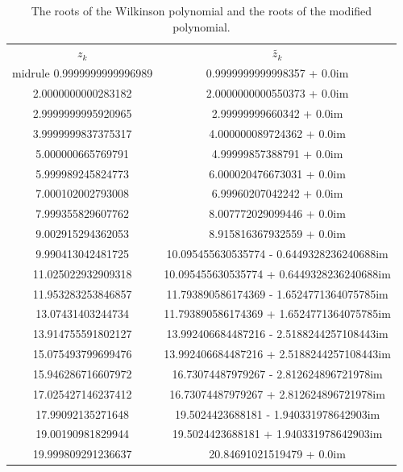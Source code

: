 \documentclass[a4paper, 12pt]{article}
\begin{document}
\begin{table}[H]
\centering
\begin{tabular}{@{}cc@{}}
\toprule
$z_k$              & $\tilde{z_k}$ \\ midrule
0.9999999999996989 & 0.9999999999998357 + 0.0im \\ \midrule
2.0000000000283182 & 2.0000000000550373 + 0.0im \\ \midrule
2.9999999995920965 & 2.99999999660342 + 0.0im \\ \midrule
3.9999999837375317 & 4.000000089724362 + 0.0im \\ \midrule
5.000000665769791  & 4.99999857388791 + 0.0im \\ \midrule
5.999989245824773  & 6.000020476673031 + 0.0im \\ \midrule
7.000102002793008  & 6.99960207042242 + 0.0im \\ \midrule
7.999355829607762  & 8.007772029099446 + 0.0im \\ \midrule
9.002915294362053  & 8.915816367932559 + 0.0im \\ \midrule
9.990413042481725  & 10.095455630535774 - 0.6449328236240688im \\ \midrule
11.025022932909318 & 10.095455630535774 + 0.6449328236240688im \\ \midrule
11.953283253846857 & 11.793890586174369 - 1.6524771364075785im \\ \midrule
13.07431403244734  & 11.793890586174369 + 1.6524771364075785im \\ \midrule
13.914755591802127 & 13.992406684487216 - 2.5188244257108443im \\ \midrule
15.075493799699476 & 13.992406684487216 + 2.5188244257108443im \\ \midrule
15.946286716607972 & 16.73074487979267 - 2.812624896721978im \\ \midrule
17.025427146237412 & 16.73074487979267 + 2.812624896721978im \\ \midrule
17.99092135271648  & 19.5024423688181 - 1.940331978642903im \\ \midrule
19.00190981829944  & 19.5024423688181 + 1.940331978642903im \\ \midrule
19.999809291236637 & 20.84691021519479 + 0.0im \\ \bottomrule
\end{tabular}
\caption{The roots of the Wilkinson polynomial and the roots of the modified polynomial.}
\label{tab:wilk_modified}
\end{table}
\end{document}
